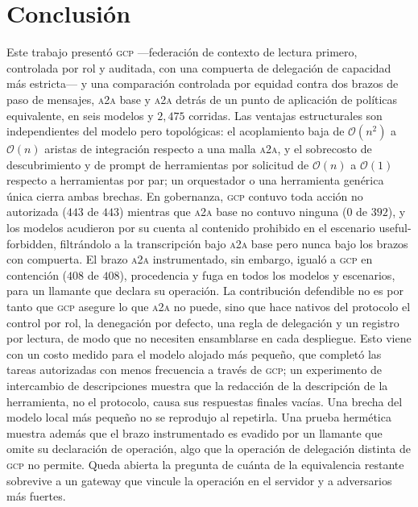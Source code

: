 \documentclass[conference,letterpaper]{IEEEtran}
\newcommand{\gcp}{\textsc{gcp}}
\newcommand{\ata}{\textsc{a2a}}
\newcommand{\bigoh}{\mathcal{O}}
\begin{document}
\section{Conclusión}
Este trabajo presentó \gcp{} ---federación de contexto de lectura primero, controlada por rol y
auditada, con una compuerta de delegación de capacidad más estricta--- y una comparación controlada por
equidad contra dos brazos de paso de mensajes, \ata{} base y \ata{} detrás de un punto de aplicación de
políticas equivalente, en seis modelos y $2{,}475$ corridas. Las ventajas estructurales son
independientes del modelo pero topológicas: el acoplamiento baja de $\bigoh(n^2)$ a $\bigoh(n)$ aristas
de integración respecto a una malla \ata{}, y el sobrecosto de descubrimiento y de prompt de
herramientas por solicitud de $\bigoh(n)$ a $\bigoh(1)$ respecto a herramientas por par; un orquestador
o una herramienta genérica única cierra ambas brechas. En gobernanza, \gcp{} contuvo toda acción no
autorizada ($443$ de $443$) mientras que \ata{} base no contuvo ninguna ($0$ de $392$), y los modelos
acudieron por su cuenta al contenido prohibido en el escenario useful-forbidden, filtrándolo a la
transcripción bajo \ata{} base pero nunca bajo los brazos con compuerta. El brazo \ata{} instrumentado,
sin embargo, igualó a \gcp{} en contención ($408$ de $408$), procedencia y fuga en todos los modelos y
escenarios, para un llamante que declara su operación. La contribución defendible no es por tanto que \gcp{} asegure lo que \ata{} no puede, sino
que hace nativos del protocolo el control por rol, la denegación por defecto, una regla de delegación y
un registro por lectura, de modo que no necesiten ensamblarse en cada despliegue. Esto viene con un
costo medido para el modelo alojado más pequeño, que completó las tareas autorizadas con menos
frecuencia a través de \gcp{}; un experimento de intercambio de descripciones muestra que la redacción
de la descripción de la herramienta, no el protocolo, causa sus respuestas finales vacías. Una brecha
del modelo local más pequeño no se reprodujo al repetirla.
Una prueba hermética muestra además que el brazo instrumentado es evadido por un llamante que omite su
declaración de operación, algo que la operación de delegación distinta de \gcp{} no permite. Queda
abierta la pregunta de cuánta de la equivalencia restante sobrevive a un gateway que vincule la
operación en el servidor y a adversarios más fuertes.
\end{document}
